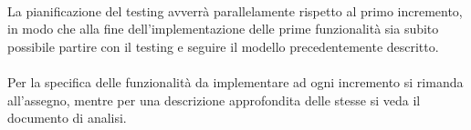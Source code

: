 \paragraph{} La pianificazione del testing avverrà parallelamente rispetto al primo incremento, in modo che alla fine dell'implementazione delle prime funzionalità sia subito possibile partire con il testing e seguire il modello precedentemente descritto.
\paragraph{} Per la specifica delle funzionalità da implementare ad ogni incremento si rimanda all'assegno, mentre per una descrizione approfondita delle stesse si veda il documento di analisi.